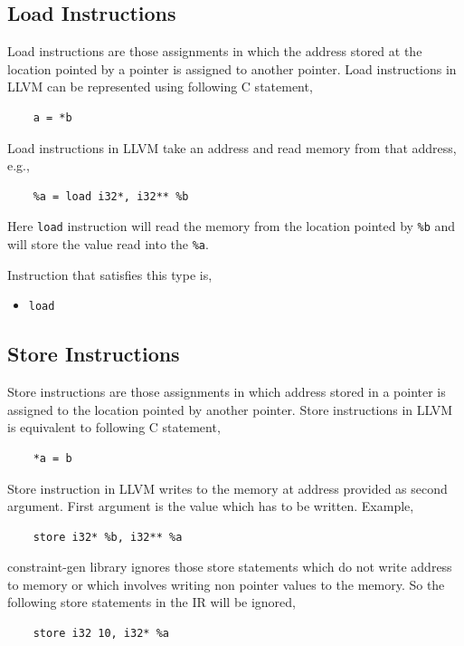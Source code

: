 \documentclass[a4paper,12pt]{report}
\begin{document}
\subsection{Load Instructions}
Load instructions are those assignments in which the address stored at the 
location pointed by a pointer is assigned to another pointer.
Load instructions in LLVM can be represented using following C statement,
\begin{lstlisting}
    a = *b
\end{lstlisting}

\noindent
Load instructions in LLVM take an address and read memory from that address,
e.g.,

\begin{verbatim}
    %a = load i32*, i32** %b
\end{verbatim}

\noindent
Here \texttt{load} instruction will read the memory from the location pointed 
by \texttt{\%b} and will store the value read into the \texttt{\%a}.

\noindent
Instruction that satisfies this type is,
\begin{itemize}
 \item \texttt{load}
\end{itemize}


\subsection{Store Instructions}
Store instructions are those assignments in which address stored in a pointer 
is assigned to the location pointed by another pointer.
Store instructions in LLVM is equivalent to following C statement,
\begin{lstlisting}
    *a = b
\end{lstlisting}

\noindent
Store instruction in LLVM writes to the memory at address provided as second
argument. First argument is the value which has to be written.
Example,
\begin{verbatim}
    store i32* %b, i32** %a
\end{verbatim}

\noindent
constraint-gen library ignores those store statements which do not write address
to memory or which involves writing non pointer values to the memory. So the
following store statements in the IR will be ignored,

\begin{lstlisting}
    store i32 10, i32* %a
\end{lstlisting}
\end{document}
